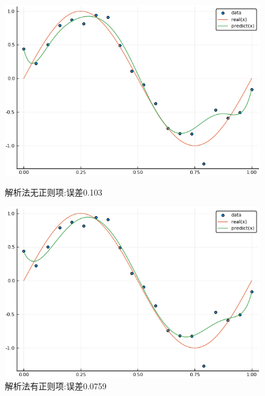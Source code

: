 \documentclass{ML}
\begin{document}
\begin{figure}[H]
	\begin{minipage}[c]{0.5\linewidth}
		\centering
		\includegraphics[width=0.9\linewidth]{media/20/ResolveNoLambda}
		\caption{解析法无正则项:误差0.103} %
		\label{fig:resolvenolambda20}
	\end{minipage}
	\begin{minipage}[c]{0.5\linewidth}
		\centering
		\includegraphics[width=0.9\linewidth]{media/20/ResolveWithLambda}
		\caption{解析法有正则项:误差0.0759} %
		\label{fig:resolvewithlambda20}
	\end{minipage}
\end{figure}
\end{document}

